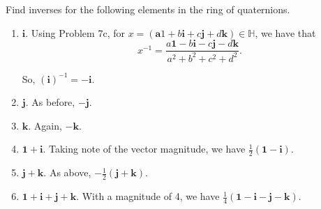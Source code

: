 \documentclass[../hw3]{subfiles}
\begin{document}
\begin{problem}
Find inverses for the following elements in the ring of quaternions.
\begin{enumerate}[label=\roman*)]
	\item $\mathbf{i}$. Using Problem 7c, for $x=(\mathbf{a}1 + b\mathbf{i} + c\mathbf{j} + d\mathbf{k})\in \mathbb{H}$, we have that \[
		      x^{-1}=\frac{a \mathbf{1} -b\mathbf{i}-c\mathbf{j}-d\mathbf{k}}{a^2 + b^2 + c^2 + d^2}
		      .\]

	      So, $(\mathbf{i})^{-1} = -\mathbf{i}$.

	\item $\mathbf{j}$. As before,  $-\mathbf{j}$.
	\item $\mathbf{k}$. Again, $-\mathbf{k}$.
	\item $\mathbf{1} + \mathbf{i}$. Taking note of the vector magnitude, we have $\frac{1}{2}(\mathbf{1}-\mathbf{i})$.
	\item $\mathbf{j} + \mathbf{k}$. As above, $-\frac{1}{2}(\mathbf{j} + \mathbf{k})$.
	\item $\mathbf{1} + \mathbf{i} + \mathbf{j} + \mathbf{k}$. With a magnitude of 4, we have $\frac{1}{4}(\mathbf{1}-\mathbf{i}-\mathbf{j}-\mathbf{k})$.
\end{enumerate}
\end{problem}
\end{document}
